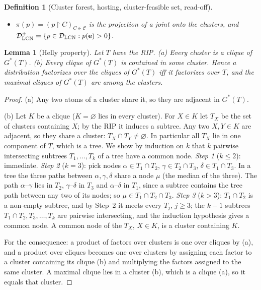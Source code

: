 \documentclass{article} %
\newtheorem{definition}{Definition}
\newtheorem{lemma}{Lemma}
\newcommand{\DLCN}{\mathcal{D}_{\mathrm{LCN}}}
\newcommand{\restr}{\!\restriction\!}
\newcommand{\readoff}{\rho}
\providecommand{\readoffcc}{\readoff^{\mathrm{cc}}}
\begin{document}
\begin{definition}[Cluster forest, hosting, cluster-feasible set, read-off]
\begin{itemize}
    the \emph{read-off} is
    $\readoff_a(q)=\langle A_{a\wedge\be},q_{C_a}\rangle/\langle A_{\be},q_{C_a}\rangle$,
    defined on $\mathcal G^{+}=\{q\in\mathcal G:\langle A_{\be},q_{C_{\be}}\rangle>0\}$, where
    $C_{\be}\supseteq\bE$ is the cluster of the normalization row; for
    $\bE=\varnothing$, $A_{\be}=\mathbf 1$, $\mathcal G^+=\mathcal G$ and
    $\readoff_a(q)=\langle A_a,q_{C_a}\rangle$. $\readoffcc_a$ is the linear
    objective \eqref{eq:nlp-obj-ev} of the scaled program.
  \item $\pi(p)=(p\restr C)_{C\in\mathcal C}$ is the \emph{projection} of a joint
    onto the clusters, and $\DLCN^{+}=\{p\in\DLCN:p(\be)>0\}$.
\end{itemize}
\end{definition}

\begin{lemma}[Helly property]\label{lem:helly}
Let $T$ have the RIP. (a) Every cluster is a clique of $G^\ast(T)$. (b) Every
clique of $G^\ast(T)$ is contained in some cluster. Hence a distribution
factorizes over the cliques of $G^\ast(T)$ iff it factorizes over $T$, and the
maximal cliques of $G^\ast(T)$ are among the clusters.
\end{lemma}

\begin{proof}
(a) Any two atoms of a cluster share it, so they are adjacent in $G^\ast(T)$.

(b) Let $K$ be a clique ($K=\varnothing$ lies in every cluster). For $X\in K$ let
$T_X$ be the set of clusters containing $X$; by the RIP it induces a subtree. Any
two $X,Y\in K$ are adjacent, so they share a cluster: $T_X\cap T_Y\ne\varnothing$.
In particular all $T_X$ lie in one component of $T$, which is a tree. We show by
induction on $k$ that $k$ pairwise intersecting subtrees $T_1,\dots,T_k$ of a tree
have a common node.
\emph{Step 1} ($k\le2$): immediate.
\emph{Step 2} ($k=3$): pick nodes $\alpha\in T_1\cap T_2$, $\gamma\in T_2\cap T_3$,
$\delta\in T_1\cap T_3$. In a tree the three paths between $\alpha,\gamma,\delta$
share a node $\mu$ (the median of the three). The path $\alpha$--$\gamma$ lies in
$T_2$, $\gamma$--$\delta$ in $T_3$ and $\alpha$--$\delta$ in $T_1$, since a subtree
contains the tree path between any two of its nodes; so $\mu\in T_1\cap T_2\cap T_3$.
\emph{Step 3} ($k>3$): $T_1\cap T_2$ is a non-empty subtree, and by Step~2 it meets
every $T_j$, $j\ge3$; the $k-1$ subtrees $T_1\cap T_2,T_3,\dots,T_k$ are pairwise
intersecting, and the induction hypothesis gives a common node.
A common node of the $T_X$, $X\in K$, is a cluster containing $K$.

For the consequence: a product of factors over clusters is one over cliques by
(a), and a product over cliques becomes one over clusters by assigning each factor
to a cluster containing its clique (b) and multiplying the factors assigned to the
same cluster. A maximal clique lies in a cluster (b), which is a clique (a), so it
equals that cluster.
\end{proof}
\end{document}
